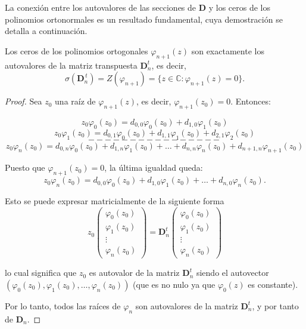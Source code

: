 La conexión entre los autovalores de las secciones de $\mathbf{D}$ y los ceros de los polinomios ortonormales es un resultado fundamental, cuya demostración se detalla a continuación.

\begin{proposition}\label{prop:eigenvalues_zeros}
	Los ceros de los polinomios ortogonales $\varphi_{n+1}(z)$ son exactamente los autovalores de la matriz transpuesta $\mathbf{D}_n^t$, es decir,
	\[
		\sigma(\mathbf{D}_n^{\,t}) = Z(\varphi_{n+1}) = \{z \in \mathbb{C} : \varphi_{n+1}(z) = 0\}.
	\]
\end{proposition}


\begin{proof}
	\noindent Sea $z_0$ una raíz de $\varphi_{n+1}(z)$, es decir, $\varphi_{n+1}(z_0)=0$. Entonces:

	$$
		z_0\varphi_0(z_0)= d_{0,0}\varphi_0(z_0)+d_{1,0}\varphi_1(z_0)
	$$
	$$
		z_0\varphi_1(z_0)= d_{0,1}\varphi_0(z_0)+d_{1,1}\varphi_1(z_0)+d_{2,1}\varphi_{2}(z_0)
	$$
	$$
		----------------
	$$
	$$
		z_0\varphi_n(z_0)= d_{0,n}\varphi_0(z_0)+d_{1,n}\varphi_1(z_0)+\dots+d_{n,n}\varphi_n(z_0)+d_{n+1,n}\varphi_{n+1}(z_0)
	$$

	\noindent Puesto que $\varphi_{n+1}(z_0)=0$, la última igualdad queda:
	$$
		z_0\varphi_n(z_0)= d_{0,0}\varphi_0(z_0)+d_{1,0}\varphi_1(z_0)+\dots+d_{n,0}\varphi_n(z_0).
	$$

	\noindent Esto se puede expresar matricialmente de la siguiente forma
	$$
		z_0\begin{pmatrix} \varphi_0(z_0) \\ \varphi_1(z_0) \\  \vdots \\ \varphi_n(z_0) \end{pmatrix} = \mathbf{D}^{t}_n \begin{pmatrix} \varphi_0(z_0) \\ \varphi_1(z_0) \\  \vdots \\ \varphi_n(z_0) \end{pmatrix}
	$$

	\noindent lo cual significa que $z_0$ es autovalor de la matriz $\mathbf{D}^{t}_n$ siendo el autovector \newline
	$(\varphi_0(z_0),\varphi_1(z_0),\dots,\varphi_n(z_0))$ (que es no nulo ya que $\varphi_0(z)$ es constante).

	\noindent Por lo tanto, todos las raíces de $\varphi_n$ son autovalores de la matriz $\mathbf{D}^{t}_n$, y por tanto de $\mathbf{D}_n$.
\end{proof}

